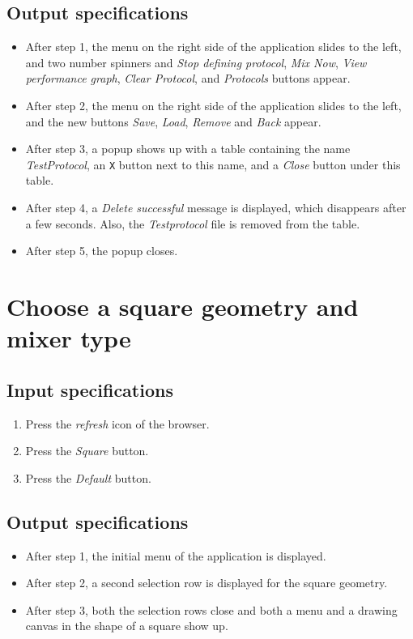 \subsection*{Output specifications}
\begin{itemize}
\item After step 1, the menu on the right side of the application slides to the left, and two number spinners and \emph{Stop defining protocol}, \emph{Mix Now}, \emph{View performance graph}, \emph{Clear Protocol}, and \emph{Protocols} buttons appear.
\item After step 2, the menu on the right side of the application slides to the left, and the new buttons \emph{Save}, \emph{Load}, \emph{Remove} and \emph{Back} appear.
\item After step 3, a popup shows up with a table containing the name \emph{TestProtocol}, an \texttt{X} button next to this name, and a \emph{Close} button under this table.
\item After step 4, a \emph{Delete successful} message is displayed, which disappears after a few seconds. Also, the \emph{Testprotocol} file is removed from the table.
\item After step 5, the popup closes.
\end{itemize}

\section{Choose a square geometry and mixer type}

\subsection*{Input specifications}
\begin{enumerate}
\item Press the \emph{refresh} icon of the browser.
\item Press the \emph{Square} button.
\item Press the \emph{Default} button.
\end{enumerate}

\subsection*{Output specifications}
\begin{itemize}
\item After step 1, the initial menu of the application is displayed.
\item After step 2, a second selection row is displayed for the square geometry.
\item After step 3, both the selection rows close and both a menu and a drawing canvas in the shape of a square show up.
\end{itemize}


